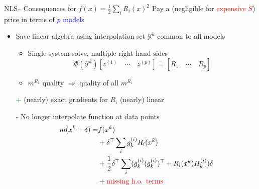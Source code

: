 \documentclass[handout,aspectratio=54]{beamer}
\numberwithin{theorem}{section}
\begin{document}
\begin{frame}{NLS– Consequences for $f(x)=\frac{1}{2}\sum_iR_i(x)^2$}
Pay a (negligible for \textcolor{red}{expensive $S$}) price in terms of \textcolor{blue}{$p$ models}

\begin{itemize}
\item Save linear algebra using interpolation set $\mathcal{Y}^k$ common to all models
\begin{itemize}
\item Single system solve, multiple right hand sides
\begin{equation*}
\Phi(\mathcal{Y}^k)[ z^{(1)}\quad\cdots\quad z^{(p)} ]=[\underline{R_1}\quad\cdots\quad\underline{R_p}]
\end{equation*}
\item $m^{R_1}$ quality $\Rightarrow$ quality of all $m^{R_i}$
\end{itemize}
\item[\textcolor{green}{+}]  (nearly) exact gradients for $R_i$ (nearly) linear
\item[\textcolor{red}{-}]  No longer interpolate function at data points
\begin{align*}\small
m(x^k+\delta) = &f(x^k)\\
&+\delta^\top\sum_ig_k^{(i)}R_i(x^k)\\
&+\frac{1}{2}\delta^\top\sum_i(g_k^{(i)}(g_k^{(i)})^\top+R_i(x^k)H_k^{(i)})\delta\\
&+\textcolor{red}{\textup{missing h.o. terms}}
\end{align*}
\end{itemize}
\end{frame}
\end{document}
